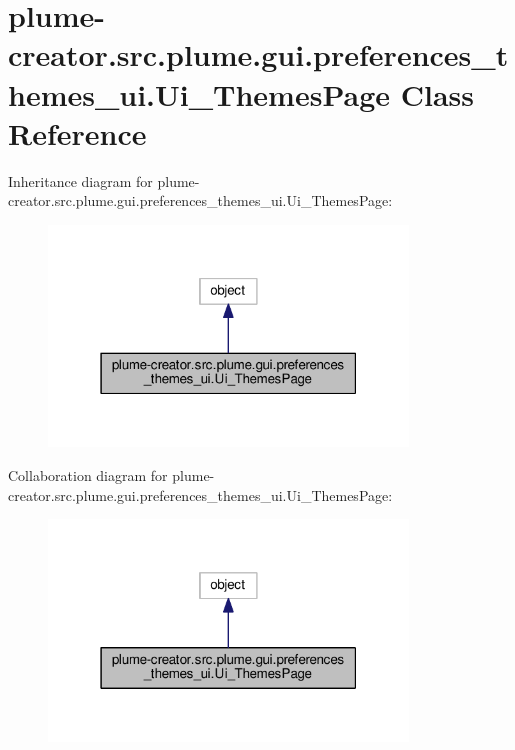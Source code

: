 \hypertarget{classplume-creator_1_1src_1_1plume_1_1gui_1_1preferences__themes__ui_1_1_ui___themes_page}{}\section{plume-\/creator.src.\+plume.\+gui.\+preferences\+\_\+themes\+\_\+ui.\+Ui\+\_\+\+Themes\+Page Class Reference}
\label{classplume-creator_1_1src_1_1plume_1_1gui_1_1preferences__themes__ui_1_1_ui___themes_page}


Inheritance diagram for plume-\/creator.src.\+plume.\+gui.\+preferences\+\_\+themes\+\_\+ui.\+Ui\+\_\+\+Themes\+Page\+:\nopagebreak
\begin{figure}[H]
\begin{center}
\leavevmode
\includegraphics[width=271pt]{classplume-creator_1_1src_1_1plume_1_1gui_1_1preferences__themes__ui_1_1_ui___themes_page__inherit__graph}
\end{center}
\end{figure}


Collaboration diagram for plume-\/creator.src.\+plume.\+gui.\+preferences\+\_\+themes\+\_\+ui.\+Ui\+\_\+\+Themes\+Page\+:\nopagebreak
\begin{figure}[H]
\begin{center}
\leavevmode
\includegraphics[width=271pt]{classplume-creator_1_1src_1_1plume_1_1gui_1_1preferences__themes__ui_1_1_ui___themes_page__coll__graph}
\end{center}
\end{figure}

